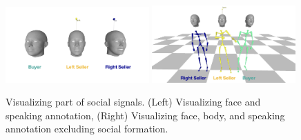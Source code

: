 \begin{figure}
	\centering
	\includegraphics[width=0.49\textwidth]{ssp_fig/haggling_ex_face}
	\includegraphics[width=0.49\textwidth]{ssp_fig/haggling_ex_facebody}
	\caption{Visualizing part of social signals. (Left) Visualizing face and speaking annotation, (Right) Visualizing face, body, and speaking annotation excluding social formation.} 
	\label{fig:haggling_measurement_vis}
\end{figure}

